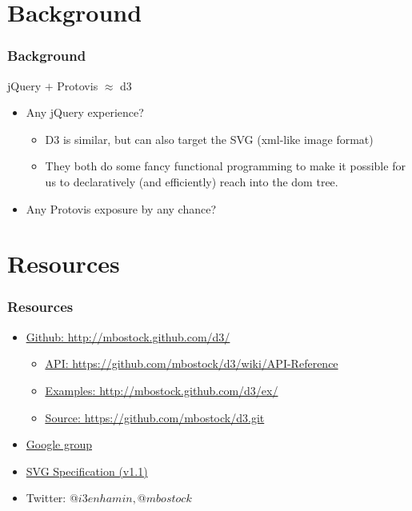 \documentclass{beamer}
\begin{document}
\section{Background}

\begin{frame}
    \frametitle{Background}
    \begin{block}{jQuery $+$ Protovis $\approx$ d3}
        \begin{itemize}
        \item Any jQuery experience?
\pause
            \begin{itemize}
            \item D3 is similar, but can also target the SVG (xml-like image format)
\pause
            \item They both do some fancy functional programming to make it possible 
                  for us to declaratively (and efficiently) reach into the dom tree.
            \end{itemize}
\pause
        \item Any Protovis exposure by any chance?
       \end{itemize}
    \end{block}
\end{frame}


\section{Resources}

\begin{frame}
    \frametitle{Resources}
\pause
        \begin{itemize}
        \item \href{http://mbostock.github.com/d3/}{\underline{Github}: http://mbostock.github.com/d3/}
            \begin{itemize}
            \item \href{https://github.com/mbostock/d3/wiki/API-Reference}{\underline{API}: https://github.com/mbostock/d3/wiki/API-Reference}
            \item \href{http://mbostock.github.com/d3/ex/}{\underline{Examples}: http://mbostock.github.com/d3/ex/}
            \item \href{https://github.com/mbostock/d3.git}{\underline{Source}: https://github.com/mbostock/d3.git}
            \end{itemize}
\pause
        \item \href{http://groups.google.com/group/d3-js?pli=1}{Google group}
\pause
        \item \href{http://www.w3.org/TR/SVG/}{SVG Specification (v1.1)}
\pause
        \item Twitter: $@i3enhamin, @mbostock$
        \end{itemize}
\end{frame}
\end{document}
